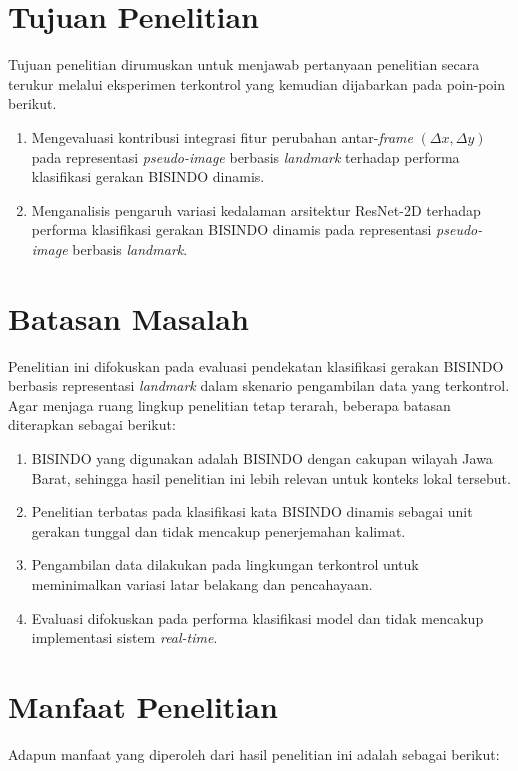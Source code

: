 \section{Tujuan Penelitian} \label{sec:tujuan}
Tujuan penelitian dirumuskan untuk menjawab pertanyaan penelitian secara terukur melalui eksperimen terkontrol yang kemudian dijabarkan pada poin-poin berikut.
\begin{enumerate}[noitemsep]
\item Mengevaluasi kontribusi integrasi fitur perubahan antar-\textit{frame} $(\Delta x, \Delta y)$ pada representasi \textit{pseudo-image} berbasis \textit{landmark} terhadap performa klasifikasi gerakan BISINDO dinamis.
\item Menganalisis pengaruh variasi kedalaman arsitektur ResNet-2D terhadap performa klasifikasi gerakan BISINDO dinamis pada representasi \textit{pseudo-image} berbasis \textit{landmark}.
\end{enumerate} \par

\section{Batasan Masalah} \label{sec:batasan}
Penelitian ini difokuskan pada evaluasi pendekatan klasifikasi gerakan BISINDO berbasis representasi \textit{landmark} dalam skenario pengambilan data yang terkontrol. Agar menjaga ruang lingkup penelitian tetap terarah, beberapa batasan diterapkan sebagai berikut:
\begin{enumerate}[noitemsep]
    \item BISINDO yang digunakan adalah BISINDO dengan cakupan wilayah Jawa Barat, sehingga hasil penelitian ini lebih relevan untuk konteks lokal tersebut.
    \item Penelitian terbatas pada klasifikasi kata BISINDO dinamis sebagai unit gerakan tunggal dan tidak mencakup penerjemahan kalimat.
    \item Pengambilan data dilakukan pada lingkungan terkontrol untuk meminimalkan variasi latar belakang dan pencahayaan.
    \item Evaluasi difokuskan pada performa klasifikasi model dan tidak mencakup implementasi sistem \textit{real-time}.
\end{enumerate}

\section{Manfaat Penelitian} \label{sec:manfaat}
Adapun manfaat yang diperoleh dari hasil penelitian ini adalah sebagai berikut: \par

